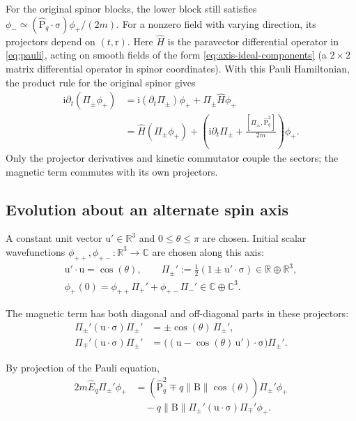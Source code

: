 \documentclass[11pt]{article}
\newcommand{\pv}[1]{{#1}}
\newcommand{\pvGreek}[1]{{#1}}
\newcommand{\vstyle}[1]{{\bm{\mathrm{#1}}}}
\newcommand{\pvPi}{\pvGreek{\Pi}}
\newcommand{\pvphi}{\pvGreek{\phi}}
\numberwithin{equation}{section}
\newcommand{\R}{\mathbb{R}}
\newcommand{\C}{\mathbb{C}}
\newcommand{\ii}{\mathrm{i}}
\newcommand{\dotprod}{\cdot}
\newcommand{\bsig}{\vstyle{\sigma}}
\newcommand{\br}{\vstyle{r}}
\newcommand{\bp}{\vstyle{P}}
\newcommand{\hEq}{\hat E_q}
\newcommand{\hbpq}{\hat{\bp}_q}
\newcommand{\hHpauli}{\hat{\pv{H}}}
\begin{document}
For the original spinor blocks, the lower block still satisfies
$\pvphi_-\simeq(\hbpq\dotprod\bsig)\pvphi_+/(2m)$.
For a nonzero field with varying direction, its projectors depend on $(t,\br)$.
Here $\hHpauli$ is the paravector differential operator in
\eqref{eq:pauli}, acting on smooth fields of the form
\eqref{eq:axis-ideal-components} (a $2\times2$ matrix differential operator
in spinor coordinates).
With this Pauli Hamiltonian,
the product rule for the original spinor gives
\begin{equation*}
 \begin{aligned}
 \ii\partial_t(\pvPi_\pm\pvphi_+)
 &=\ii(\partial_t\pvPi_\pm)\pvphi_++\pvPi_\pm \hHpauli\pvphi_+\\
 &=\hHpauli(\pvPi_\pm\pvphi_+)
   +\left(\ii\partial_t\pvPi_\pm
          +\frac{[\pvPi_\pm,\hbpq^2]}{2m}\right)\pvphi_+.
 \end{aligned}
\end{equation*}
Only the projector derivatives and kinetic commutator couple the
sectors; the magnetic term commutes with its own projectors.

\subsection{Evolution about an alternate spin axis}
\label{sec:alternate-spin-alignment}
A constant unit vector $\vstyle{u}'\in\R^3$ and $0\le\theta\le\pi$ are chosen.
Initial scalar wavefunctions $\phi_{++},\phi_{+-}:\R^3\to\C$ are chosen along this axis:
\[
\begin{gathered}
\vstyle{u}'\dotprod\vstyle{u}=\cos(\theta),\qquad
\pvPi_\pm':=\frac12(1\pm\vstyle{u}'\dotprod\bsig)\in\R\oplus\R^3,\\
\pvphi_+(0)=\phi_{++}\pvPi_+'+\phi_{+-}\pvPi_-'\in\C\oplus\C^3.
\end{gathered}
\]

The magnetic term has both diagonal and off-diagonal parts in these projectors:
\[
\begin{aligned}
\pvPi_\pm'(\vstyle{u}\dotprod\bsig)\pvPi_\pm'
&=\pm\cos(\theta)\,\pvPi_\pm',\\
\pvPi_\mp'(\vstyle{u}\dotprod\bsig)\pvPi_\pm'
&=\bigl((\vstyle{u}-\cos(\theta)\,\vstyle{u}')\dotprod\bsig\bigr)\pvPi_\pm'.
\end{aligned}
\]

By projection of the Pauli equation,
\[
\begin{aligned}
2m\hEq\pvPi_\pm'\pvphi_+
&=(\hbpq^2\mp q\lVert\vstyle{B}\rVert\cos(\theta))\pvPi_\pm'\pvphi_+\\
&\quad-q\lVert\vstyle{B}\rVert
\pvPi_\pm'(\vstyle{u}\dotprod\bsig)\pvPi_\mp'\pvphi_+.
\end{aligned}
\]
\end{document}
